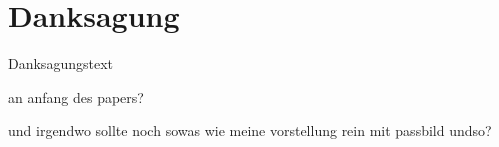 
\chapter*{Danksagung}


Danksagungstext

an anfang des papers?

und irgendwo sollte noch sowas wie meine vorstellung rein mit passbild undso?
